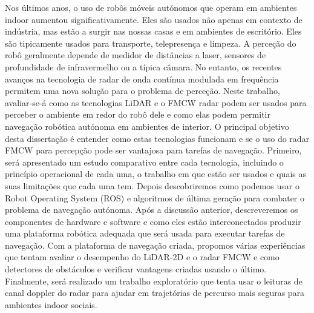 \TitlePage
  \vspace*{55mm}
       {Nos últimos anos, o uso de robôs móveis autónomos que operam em ambientes indoor aumentou significativamente. Eles são usados não apenas
        em contexto de indústria, mas estão a surgir nas nossas casas e em ambientes de escritório. Eles são tipicamente usados para transporte, telepresença e limpeza. A perceção do robô geralmente depende de medidor de distâncias a laser, sensores de profundidade de infravermelho ou a típica câmara. No entanto, os recentes avanços na tecnologia de radar de onda contínua mo\-du\-la\-da em frequência permitem uma nova solução para o problema de perceção. Neste trabalho, avaliar-se-á como  as tecnologias \ac{LiDAR} e o \ac{FMCW} \ac{radar} podem ser usados para perceber o ambiente em redor do robô dele e como elas podem permitir  navegação robótica autónoma em ambientes de interior. O principal objetivo desta dissertação é
        entender como estas tecnologias funcionam e se o uso do radar FMCW para
        percepção pode ser vantajosa para tarefas de navegação.
       }
       \TEXT{}
       { Primeiro, será apresentado um estudo comparativo entre cada tecnologia, incluindo o princípio operacional de cada uma, o trabalho em que estão ser usados e quais as suas limitações que cada uma tem. Depois descobriremos como podemos usar o Robot Operating
        System (ROS) e algoritmos de última geração para combater o problema de navegação autónoma. Após a discussão anterior, descreveremos
        os componentes de hardware e software e como eles estão interconectados
        produzir uma plataforma robótica adequada que será usada para executar tarefas de navegação.
        Com a plataforma de navegação criada, propomos várias experiências que
        tentam avaliar o desempenho do LiDAR-2D e o radar FMCW e  como
        detectores de obstáculos e verificar vantagens criadas usando o
        último. Finalmente, será realizado um trabalho exploratório que tenta usar o
        leituras de canal doppler do radar para ajudar em trajetórias de percurso mais seguras para ambientes indoor sociais.}
       \TEXT{}     
       {%
       }
 
